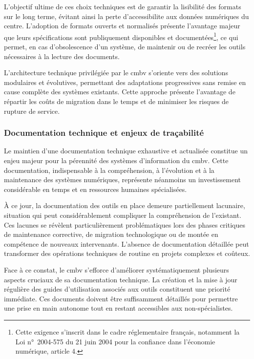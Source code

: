 L'objectif ultime de ces choix techniques est de garantir la lisibilité des formats sur le long terme, évitant ainsi la perte d'\gls{accessibilite} aux données numériques du centre. L'adoption de formats ouverts et normalisés présente l'avantage majeur que leurs spécifications sont publiquement disponibles et documentées\footnote{Cette exigence s'inscrit dans le cadre réglementaire français, notamment la Loi n°~2004-575 du 21 juin 2004 pour la confiance dans l'économie numérique, article 4.}, ce qui permet, en cas d'obsolescence d'un système, de maintenir ou de recréer les outils nécessaires à la lecture des documents.

L'architecture technique privilégiée par le \gls{cmbv} s'oriente vers des solutions modulaires et évolutives, permettant des adaptations progressives sans remise en cause complète des systèmes existants. Cette approche présente l'avantage de répartir les coûts de migration dans le temps et de minimiser les risques de rupture de service.

\subsubsection{Documentation technique et enjeux de traçabilité}

Le maintien d'une documentation technique exhaustive et actualisée constitue un enjeu majeur pour la pérennité des systèmes d'information du \gls{cmbv}. Cette documentation, indispensable à la compréhension, à l'évolution et à la maintenance des systèmes numériques, représente néanmoins un investissement considérable en temps et en ressources humaines spécialisées.

À ce jour, la documentation des outils en place demeure partiellement lacunaire, situation qui peut considérablement compliquer la compréhension de l'existant. Ces lacunes se révèlent particulièrement problématiques lors des phases critiques de maintenance corrective, de migration technologique ou de montée en compétence de nouveaux intervenants. L'absence de documentation détaillée peut transformer des opérations techniques de routine en projets complexes et coûteux.

Face à ce constat, le \gls{cmbv} s'efforce d'améliorer systématiquement plusieurs aspects cruciaux de sa documentation technique. La création et la mise à jour régulière des guides d'utilisation associés aux outils constituent une priorité immédiate. Ces documents doivent être suffisamment détaillés pour permettre une prise en main autonome tout en restant accessibles aux non-spécialistes.

